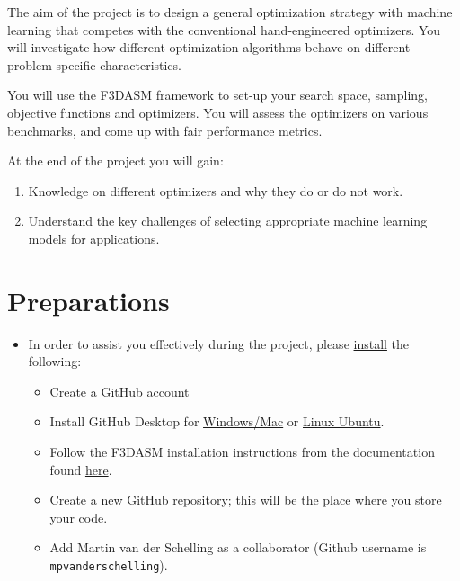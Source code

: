 \documentclass[10pt,a4paper,twoside]{article} %
\def\code#1{\texttt{#1}}
\begin{document}

The aim of the project is to design a general optimization strategy with machine learning that competes with the conventional hand-engineered optimizers. You will investigate how different optimization algorithms behave on different problem-specific characteristics. 

You will use the F3DASM framework to set-up your search space, sampling, objective functions and optimizers. You will assess the optimizers on various benchmarks, and come up with fair performance metrics.

At the end of the project you will gain:
\begin{enumerate}
	\item Knowledge on different optimizers and why they do or do not work.
	\item Understand the key challenges of selecting appropriate machine learning models for applications.

\end{enumerate}

\section*{Preparations}

\vspace{5mm}
 

\begin{itemize}
\setcounter{enumi}{1}
	\item In order to assist you effectively during the project, please \underline{install} the following:
	
	\begin{itemize}
		
		\item Create a \href{https://github.com/}{GitHub} account
		
		\item Install GitHub Desktop for \href{https://desktop.github.com/}{Windows/Mac} or \href{https://linuxhint.com/install-and-use-github-desktop-on-ubuntu/}{Linux Ubuntu}.
		
		\item Follow the F3DASM installation instructions from the documentation found \href{https://bessagroup.github.io/F3DASM/gettingstarted.html}{here}.
		
		\item Create a new GitHub repository; this will be the place where you store your code.
		
		\item Add Martin van der Schelling as a collaborator (Github username is \code{mpvanderschelling}).
		
	\end{itemize}
	
\end{itemize}
\end{document}

